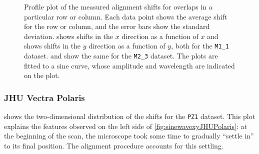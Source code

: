 \documentclass{article}
\newcommand{\M}[2]{\texttt{M#1\_#2}}
\begin{document}
\begin{figure}[ht]
\begin{subfigure}{0.24\linewidth}
	       \caption{}
	       \label{fig:sinewaveyy2}
	\end{subfigure}
	\caption{Profile plot of the measured alignment shifts for overlaps in a particular row or column.  Each data point shows the average shift for the row or column, and the error bars show the standard deviation.   shows shifts in the $x$ direction as a function of $x$ and  shows shifts in the $y$ direction as a function of $y$, both for the \M11 dataset.   and  show the same for the \M23 dataset.  The plots are fitted to a sine curve, whose amplitude and wavelength are indicated on the plot.}
	\label{fig:sinewaves}
       
\end{figure}

\subsubsection{JHU Vectra Polaris}
\label{sec:polaris2D}

 shows the two-dimensional distribution of the shifts for the \texttt{PZ1} dataset.  This plot explains the features observed on the left side of \cref{fig:sinewavexyJHUPolaris}: at the beginning of the scan, the microscope took some time to gradually ``settle in'' to its final position.  The alignment procedure accounts for this settling.
\end{document}
